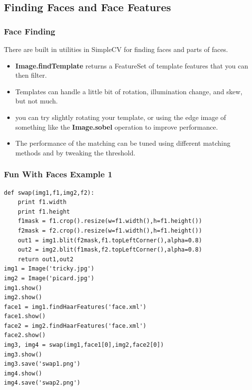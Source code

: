 \documentclass{beamer}
\begin{document}
\subsection{Finding Faces and Face Features}
\begin{frame}
  \frametitle{Face Finding}
There are built in utilities in SimpleCV for finding faces and parts
of faces.
\begin{itemize}
\item \textbf{Image.findTemplate} returns a FeatureSet of template features
  that you can then filter.
\item Templates can handle a little bit of rotation, illumination
  change, and skew, but not much.
\item you can try slightly rotating your template, or using the edge
  image of something like the \textbf{Image.sobel} operation to
  improve performance.
\item The performance of the matching can be tuned using different
  matching methods and by tweaking the threshold.
\end{itemize}
\end{frame}
\begin{frame}[fragile] 
\frametitle{Fun With Faces Example 1}
\begin{example}
\begin{verbatim}
def swap(img1,f1,img2,f2):
    print f1.width
    print f1.height
    f1mask = f1.crop().resize(w=f1.width(),h=f1.height())
    f2mask = f2.crop().resize(w=f1.width(),h=f1.height())
    out1 = img1.blit(f2mask,f1.topLeftCorner(),alpha=0.8)
    out2 = img2.blit(f1mask,f2.topLeftCorner(),alpha=0.8)
    return out1,out2
img1 = Image('tricky.jpg')
img2 = Image('picard.jpg')
img1.show()
img2.show()
face1 = img1.findHaarFeatures('face.xml')
face1.show()
face2 = img2.findHaarFeatures('face.xml')
face2.show()
img3, img4 = swap(img1,face1[0],img2,face2[0])
img3.show()
img3.save('swap1.png')
img4.show()
img4.save('swap2.png')
\end{verbatim}
\end{example}
\end{frame} 
\end{document}
